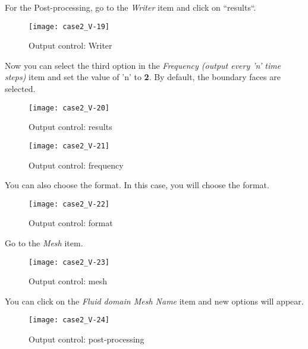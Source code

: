 \newpage
For the Post-processing, go to the {\itshape Writer} item and click on ``results``.
\begin{figure}[h!]
\begin{center}
\texttt{[image: case2\_V-19]}
\caption{Output control: Writer}
\label{fig23b_e2}
\end{center}
\end{figure}
\newpage
Now you can select the third option in the {\itshape Frequency (output every 'n' time steps)} item
and set the value of 'n' to {\bf 2}. By default, the boundary faces are selected.
\begin{figure}[h!]
\begin{center}
\texttt{[image: case2\_V-20]}
\caption{Output control: results}
\label{fig23c_e2}
\end{center}
\end{figure}

\newpage

\begin{figure}[h!]
\begin{center}
\texttt{[image: case2\_V-21]}
\caption{Output control: frequency}
\label{fig23d_e2}
\end{center}
\end{figure}

\newpage
You can also choose the format. In this case, you will choose the \ensight format.
\begin{figure}[h!]
\begin{center}
\texttt{[image: case2\_V-22]}
\caption{Output control: format}
\label{fig23e_e2}
\end{center}
\end{figure}

\newpage

Go to the {\itshape{Mesh}} item.
\begin{figure}[h!]
\begin{center}
\texttt{[image: case2\_V-23]}
\caption{Output control: mesh}
\label{fig23f_e2}
\end{center}
\end{figure}

\newpage
You can click on the {\itshape Fluid domain Mesh Name } item and new options will appear.
\begin{figure}[h!]
\begin{center}
\texttt{[image: case2\_V-24]}
\caption{Output control: post-processing}
\label{fig24_e2}
\end{center}
\end{figure}

